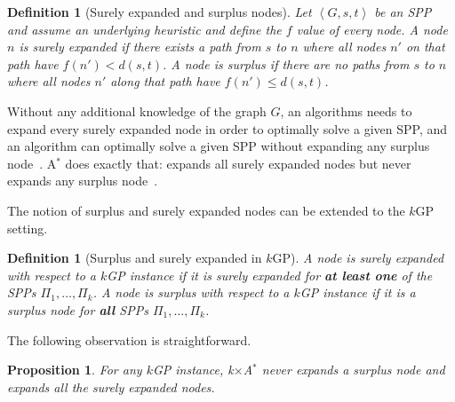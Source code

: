 \documentclass[twoside,11pt]{article}
\newtheorem{definition}[theorem]{Definition}
\newtheorem{proposition}[theorem]{Proposition}
\newcommand{\kgs}{$k$GP\xspace}
\newcommand{\astar}{A$^*$\xspace}
\newcommand{\kxastar}{k$\times$A$^*$\xspace}
\newcommand{\tuple}[1]{\ensuremath{\left \langle #1 \right \rangle }}
\newcommand{\abda}[1]{\textbf{[AS:#1]}}
\begin{document}
\begin{definition}[Surely expanded and surplus nodes]
  \label{def:surplus}
  Let $\tuple{G, s, t}$ be an \ac{SPP} and assume an underlying heuristic and define the $f$ value of every node.
  A node $n$ is \emph{surely expanded} if there exists a path from $s$ to $n$ where all nodes $n'$ on that path  have $f(n') < d(s, t)$. 
  A node is \emph{surplus} if there are no paths from $s$ to $n$ where all nodes $n'$
  along that path have $f(n') \leq d(s, t)$.
\end{definition}

Without any additional knowledge of the graph $G$, an algorithms needs to expand every surely expanded node in order to optimally solve a given SPP, and an algorithm can optimally solve a given SPP without expanding any surplus node~\cite{dechter1985generalizedBestFirst,goldenberg2014enhanced}.
\astar does exactly that: expands all surely expanded nodes but never expands any surplus node~\cite{dechter1985generalizedBestFirst}.

The notion of surplus and surely expanded nodes can be extended to the \kgs setting.

\begin{definition}[Surplus and surely expanded in \kgs]
  \label{def:surplus-k-goal}
  A node is \emph{surely expanded} with respect to a \kgs instance if it is surely expanded for \textbf{at least one} of the \acp{SPP} $\Pi_1,\ldots, \Pi_k$. A node is \emph{surplus} with respect to a \kgs instance if it is a surplus node for \textbf{all} \acp{SPP} $\Pi_1,\ldots, \Pi_k$.
\end{definition}


The following observation is straightforward.
\begin{proposition}
  \label{prop:kxastar-effective}
  For any \kgs instance, \kxastar never expands a surplus node and expands all the surely expanded nodes.
\end{proposition}
\end{document}
